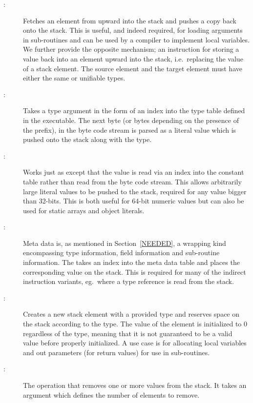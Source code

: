 \begin{description}

\item[:]

  Fetches an element from upward into the stack and pushes a copy back onto the
  stack. This is useful, and indeed required, for loading arguments in
  sub-routines and can be used by a compiler to implement local variables. We
  further provide the opposite mechanism; an instruction for storing a value
  back into an element upward into the stack, i.e.~replacing the value of a
  stack element. The source element and the target element must have either the
  same or unifiable types.

\item[:]

  Takes a type argument in the form of an index into the type table defined in
  the executable. The next byte (or bytes depending on the presence of the
   prefix), in the byte code stream is parsed as a literal value
  which is pushed onto the stack along with the type.

\item[:]

  Works just as  except that the value is read via an index
  into the constant table rather than read from the byte code stream. This
  allows arbitrarily large literal values to be pushed to the stack, required
  for any value bigger than 32-bits. This is both useful for 64-bit numeric
  values but can also be used for static arrays and object literals.

\item[:]

  Meta data is, as mentioned in Section~\ref{NEEDED}, a wrapping kind
  encompassing type information, field information and sub-routine
  information. The  takes an index into the meta data table and
  places the corresponding value on the stack. This is required for many of the
  indirect instruction variants, eg.~where a type reference is read from the
  stack.

\item[:]

  Creates a new stack element with a provided type and reserves space on the
  stack according to the type. The value of the element is initialized to 0
  regardless of the type, meaning that it is not guaranteed to be a valid value
  before properly initialized. A use case is for allocating local variables and
  out parameters (for return values) for use in sub-routines.

\item[:]

  The operation that removes one or more values from the stack. It takes an
  argument which defines the number of elements to remove.

\end{description}

